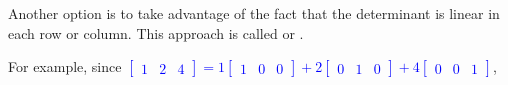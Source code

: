 \begin{observation}
Another option is to take advantage of the fact that the determinant is linear 
in each row or column.  This approach is called
 or . 

For example, since 
\textcolor{blue}{\(
  \begin{bmatrix} 1 & 2 & 4 \end{bmatrix} 
= 
  1\begin{bmatrix} 1 & 0 & 0 \end{bmatrix}
+
  2\begin{bmatrix} 0 & 1 &  0 \end{bmatrix}
+
  4\begin{bmatrix} 0  & 0 & 1 \end{bmatrix}
\)},


\end{observation}
